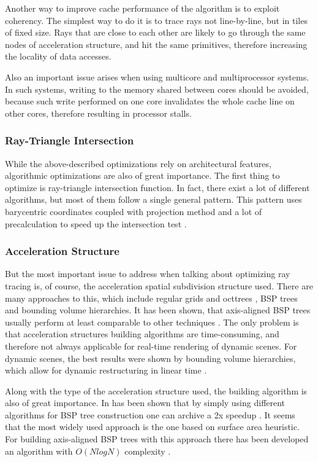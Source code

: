 \documentclass{article}
\begin{document}
Another way to improve cache performance of the algorithm is to exploit coherency. The simplest way to do it is to trace rays not line-by-line, but in tiles of fixed size. Rays that are close to each other are likely to go through the same nodes of acceleration structure, and hit the same primitives, therefore increasing the locality of data accesses.

Also an important issue arises when using multicore and multiprocessor systems. In such systems, writing to the memory shared between cores should be avoided, because such write performed on one core invalidates the whole cache line on other cores, therefore resulting in processor stalls.


\subsubsection{Ray-Triangle Intersection}
While the above-described optimizations rely on architectural features, algorithmic optimizations are also of great importance. The first thing to optimize is ray-triangle intersection function. In fact, there exist a lot of different algorithms, but most of them follow a single general pattern. This pattern uses barycentric coordinates coupled with projection method and a lot of precalculation to speed up the intersection test \cite{wald04, badouel92}.

\subsubsection{Acceleration Structure}
But the most important issue to address when talking about optimizing ray tracing is, of course, the acceleration spatial subdivision structure used. There are many approaches to this, which include regular grids and octtrees \cite{dmitriev00}, BSP trees and bounding volume hierarchies. It has been shown, that axis-aligned BSP trees usually perform at least comparable to other techniques \cite{havran01}. The only problem is that acceleration structures building algorithms are time-consuming, and therefore not always applicable for real-time rendering of dynamic scenes. For dynamic scenes, the best results were shown by bounding volume hierarchies, which allow for dynamic restructuring in linear time \cite{yoon07}.

Along with the type of the acceleration structure used, the building algorithm is also of great importance. In has been shown that by simply using different algorithms for BSP tree construction one can archive a 2x speedup \cite{wald04}. It seems that the most widely used approach is the one based on surface area heuristic. For building axis-aligned BSP trees with this approach there has been developed an algorithm with $O(N log N)$ complexity \cite{wald06}.
\end{document}
